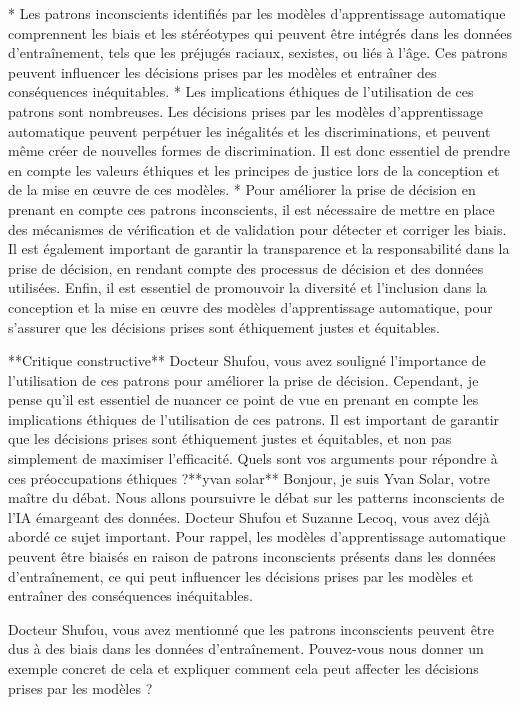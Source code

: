 * Les patrons inconscients identifiés par les modèles d'apprentissage automatique comprennent les biais et les stéréotypes qui peuvent être intégrés dans les données d'entraînement, tels que les préjugés raciaux, sexistes, ou liés à l'âge. Ces patrons peuvent influencer les décisions prises par les modèles et entraîner des conséquences inéquitables.
* Les implications éthiques de l'utilisation de ces patrons sont nombreuses. Les décisions prises par les modèles d'apprentissage automatique peuvent perpétuer les inégalités et les discriminations, et peuvent même créer de nouvelles formes de discrimination. Il est donc essentiel de prendre en compte les valeurs éthiques et les principes de justice lors de la conception et de la mise en œuvre de ces modèles.
* Pour améliorer la prise de décision en prenant en compte ces patrons inconscients, il est nécessaire de mettre en place des mécanismes de vérification et de validation pour détecter et corriger les biais. Il est également important de garantir la transparence et la responsabilité dans la prise de décision, en rendant compte des processus de décision et des données utilisées. Enfin, il est essentiel de promouvoir la diversité et l'inclusion dans la conception et la mise en œuvre des modèles d'apprentissage automatique, pour s'assurer que les décisions prises sont éthiquement justes et équitables.

**Critique constructive**
Docteur Shufou, vous avez souligné l'importance de l'utilisation de ces patrons pour améliorer la prise de décision. Cependant, je pense qu'il est essentiel de nuancer ce point de vue en prenant en compte les implications éthiques de l'utilisation de ces patrons. Il est important de garantir que les décisions prises sont éthiquement justes et équitables, et non pas simplement de maximiser l'efficacité. Quels sont vos arguments pour répondre à ces préoccupations éthiques ?**yvan solar**
Bonjour, je suis Yvan Solar, votre maître du débat. Nous allons poursuivre le débat sur les patterns inconscients de l'IA émargeant des données. Docteur Shufou et Suzanne Lecoq, vous avez déjà abordé ce sujet important. Pour rappel, les modèles d'apprentissage automatique peuvent être biaisés en raison de patrons inconscients présents dans les données d'entraînement, ce qui peut influencer les décisions prises par les modèles et entraîner des conséquences inéquitables.

Docteur Shufou, vous avez mentionné que les patrons inconscients peuvent être dus à des biais dans les données d'entraînement. Pouvez-vous nous donner un exemple concret de cela et expliquer comment cela peut affecter les décisions prises par les modèles ?

